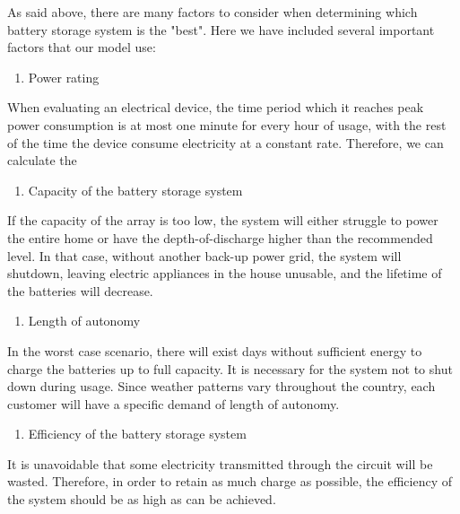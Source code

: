 As said above, there are many factors to consider when determining which battery storage system is the "best". Here we have included several important factors that our model use:
\begin{enumerate}
    \item Power rating
\end{enumerate}
When evaluating an electrical device, the time period which it reaches peak power consumption is at most one minute for every hour of usage, with the rest of the time the device consume electricity at a constant rate. Therefore, we can calculate the  
\begin{enumerate}[resume]
    \item Capacity of the battery storage system
\end{enumerate}
If the capacity of the array is too low, the system will either struggle to power the entire home or have the depth-of-discharge higher than the recommended level. In that case, without another back-up power grid, the system will shutdown, leaving electric appliances in the house unusable, and the lifetime of the batteries will decrease.
\begin{enumerate}[resume]
    \item Length of autonomy
\end{enumerate}
In the worst case scenario, there will exist days without sufficient energy to charge the batteries up to full capacity. It is necessary for the system not to shut down during usage. Since weather patterns vary throughout the country, each customer will have a specific demand of length of autonomy.
\begin{enumerate}[resume]
    \item Efficiency of the battery storage system
\end{enumerate}
It is unavoidable that some electricity transmitted through the circuit will be wasted. Therefore, in order to retain as much charge as possible, the efficiency of the system should be as high as can be achieved.
